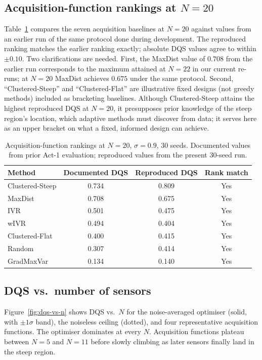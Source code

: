 \documentclass[11pt,letterpaper]{article}
\begin{document}
\subsection{Acquisition-function rankings at $N=20$}
Table~\ref{tab:rankings} compares the seven acquisition baselines at
$N=20$ against values from an earlier run of the same protocol done
during development. The reproduced ranking matches the earlier
ranking exactly; absolute DQS values agree to within $\pm 0.10$.
Two clarifications are needed. First, the MaxDist value of $0.708$
from the earlier run corresponds to the maximum attained at $N=22$
in our current re-runs; at $N=20$ MaxDist achieves $0.675$ under the
same protocol. Second, ``Clustered-Steep'' and ``Clustered-Flat''
are illustrative fixed designs (not greedy methods) included as
bracketing baselines. Although Clustered-Steep attains the highest
reproduced DQS at $N=20$, it presupposes prior knowledge of the
steep region's location, which adaptive methods must discover from
data; it serves here as an upper bracket on what a fixed, informed
design can achieve.

\begin{table}[H]
\centering
\caption{Acquisition-function rankings at $N=20$, $\sigma=0.9$, 30
seeds. Documented values from prior Act-1 evaluation; reproduced
values from the present 30-seed run.}
\label{tab:rankings}
\begin{tabular}{@{}lccc@{}}
\toprule
Method             & Documented DQS & Reproduced DQS & Rank match \\
\midrule
Clustered-Steep    & 0.734 & 0.809 & Yes \\
MaxDist            & 0.708 & 0.675 & Yes \\
IVR                & 0.501 & 0.475 & Yes \\
wIVR               & 0.494 & 0.404 & Yes \\
Clustered-Flat     & 0.400 & 0.415 & Yes \\
Random             & 0.307 & 0.414 & Yes \\
GradMaxVar         & 0.134 & 0.140 & Yes \\
\bottomrule
\end{tabular}
\end{table}

\subsection{DQS vs.\ number of sensors}
Figure~\ref{fig:dqs-vs-n} shows DQS vs.\ $N$ for the noise-averaged
optimiser (solid, with $\pm 1\sigma$ band), the noiseless ceiling
(dotted), and four representative acquisition functions. The optimiser
dominates at every $N$. Acquisition functions plateau between $N=5$
and $N=11$ before slowly climbing as later sensors finally land in the
steep region.
\end{document}
